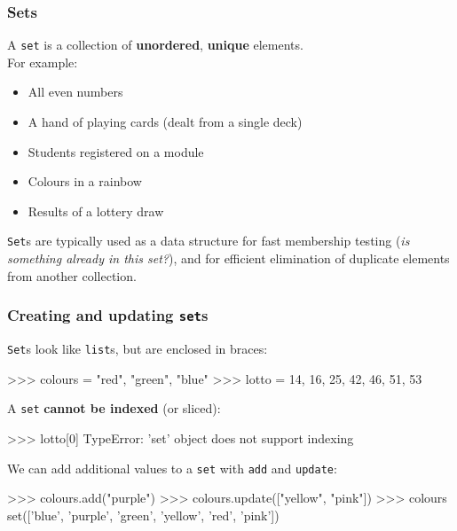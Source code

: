\documentclass{beamer}
\begin{document}
\begin{frame}[fragile]
\frametitle{Sets}
    A \texttt{set} is a collection of \textbf{unordered}, \textbf{unique} elements.\\
    For example:

    \begin{itemize}
        \item All even numbers
        \item A hand of playing cards (dealt from a single deck)
        \item Students registered on a module
        \item Colours in a rainbow
        \item Results of a lottery draw
    \end{itemize}

    \texttt{Set}s are typically used as a data structure for fast 
    membership testing (\textit{is something already in this set?}), and for
    efficient elimination of duplicate elements from another collection.
\end{frame}


\begin{frame}[fragile]
\frametitle{Creating and updating \texttt{set}s}
\texttt{Set}s look like \texttt{list}s, but are enclosed in braces:
\begin{code}
>>> colours = {"red", "green", "blue"}
>>> lotto = {14, 16, 25, 42, 46, 51, 53}
\end{code}

\vskip 0.2cm
A \texttt{set} \textbf{cannot be indexed} (or sliced):
\begin{code}
>>> lotto[0]
TypeError: 'set' object does not support indexing
\end{code}

\vskip 0.2cm
    We can add additional values to a \texttt{set} with \texttt{add} and \texttt{update}:
\begin{code}
>>> colours.add("purple")
>>> colours.update(["yellow", "pink"])
>>> colours
set(['blue', 'purple', 'green', 'yellow', 'red', 'pink'])
\end{code}
\end{frame}
\end{document}
